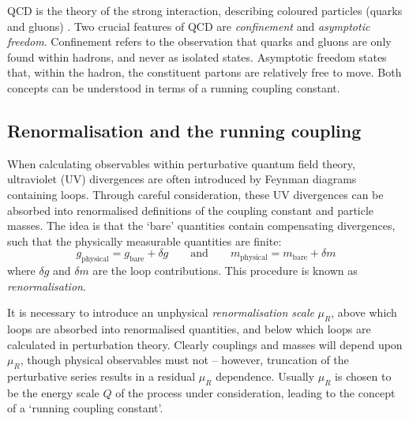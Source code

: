 
\ac{QCD} is the theory of the strong interaction, describing coloured particles (quarks 
and gluons) \cite{Ellis:1996}. Two crucial features of \ac{QCD} are \textit{confinement} 
and \textit{asymptotic freedom}. Confinement refers to the observation that quarks and 
gluons are only found within hadrons, and never as isolated states. Asymptotic freedom 
states that, within the hadron, the constituent partons are relatively free to move. Both 
concepts can be understood in terms of a running coupling constant.



\subsection{Renormalisation and the running coupling}
\label{sec:qcd:renormalisation}

When calculating observables within perturbative quantum field theory, ultraviolet (UV) 
divergences are often introduced by Feynman diagrams containing loops. Through careful 
consideration, these UV divergences can be absorbed into renormalised definitions of the 
coupling constant and particle masses. The idea is that the `bare' quantities contain 
compensating divergences, such that the physically measurable quantities are finite:
\begin{equation}
	g_{\text{physical}} = g_{\text{bare}} + \delta g
	\quad\quad\text{and}\quad\quad
	m_{\text{physical}} = m_{\text{bare}} + \delta m
\end{equation}
where $\delta g$ and $\delta m$ are the loop contributions. This procedure is known as 
\textit{renormalisation}.

It is necessary to introduce an unphysical \textit{renormalisation scale} $\mu_R$, above 
which loops are absorbed into renormalised quantities, and below which loops are 
calculated in perturbation theory. Clearly couplings and masses will depend upon $\mu_R$,
though physical observables must not -- however, truncation of the perturbative series 
results in a residual $\mu_R$ dependence. Usually $\mu_R$ is chosen to be the energy 
scale $Q$ of the process under consideration, leading to the concept of a `running 
coupling constant'.

